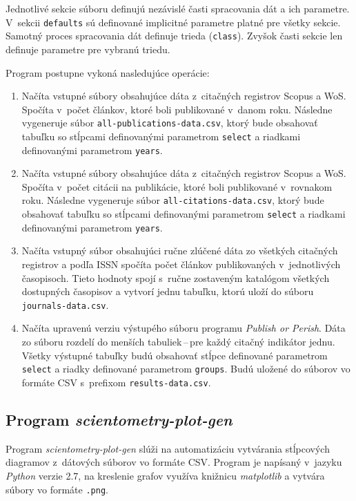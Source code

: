 Jednotlivé sekcie súboru definujú nezávislé časti spracovania dát a ich
parametre. V~sekcii \verb|defaults| sú definované implicitné parametre platné
pre všetky sekcie. Samotný proces spracovania dát definuje trieda
(\verb|class|). Zvyšok časti sekcie len definuje parametre pre vybranú triedu.

Program postupne vykoná nasledujúce operácie:

\begin{enumerate}
\item Načíta vstupné súbory obsahujúce dáta z~citačných registrov Scopus a
  WoS. Spočíta v~počet článkov, ktoré boli publikované v~danom roku. Následne
  vygeneruje súbor \verb|all-publications-data.csv|, ktorý bude obsahovať
  tabuľku so stĺpcami definovanými parametrom \verb|select| a riadkami
  definovanými parametrom \verb|years|.
\item Načíta vstupné súbory obsahujúce dáta z~citačných registrov Scopus a
  WoS. Spočíta v~počet citácii na publikácie, ktoré boli publikované v~rovnakom
  roku. Následne vygeneruje súbor \verb|all-citations-data.csv|, ktorý bude
  obsahovať tabuľku so stĺpcami definovanými parametrom \verb|select| a riadkami
  definovanými parametrom \verb|years|.
\item Načíta vstupný súbor obsahujúci ručne zlúčené dáta zo všetkých citačných
  registrov a podľa ISSN spočíta počet článkov publikovaných v~jednotlivých
  časopisoch. Tieto hodnoty spojí s~ručne zostaveným katalógom všetkých
  dostupných časopisov a vytvorí jednu tabuľku, ktorú uloží do súboru
  \verb|journals-data.csv|.
\item Načíta upravenú verziu výstupého súboru programu \emph{Publish or Perish}.
  Dáta zo súboru rozdelí do menších tabuliek\,--\,pre každý citačný indikátor
  jednu. Všetky výstupné tabuľky budú obsahovať stĺpce definované parametrom
  \verb|select| a riadky definované parametrom \verb|groups|. Budú uložené do
  súborov vo formáte CSV s~prefixom \verb|results-data.csv|.
\end{enumerate}


\subsection*{Program \emph{scientometry-plot-gen}}

Program \emph{scientometry-plot-gen} slúži na automatizáciu vytvárania
stĺpcových diagramov z~dátových súborov vo formáte CSV. Program je napísaný
v~jazyku \emph{Python} verzie 2.7, na kreslenie grafov využíva knižnicu
\emph{matplotlib} a vytvára súbory vo formáte \texttt{.png}.

